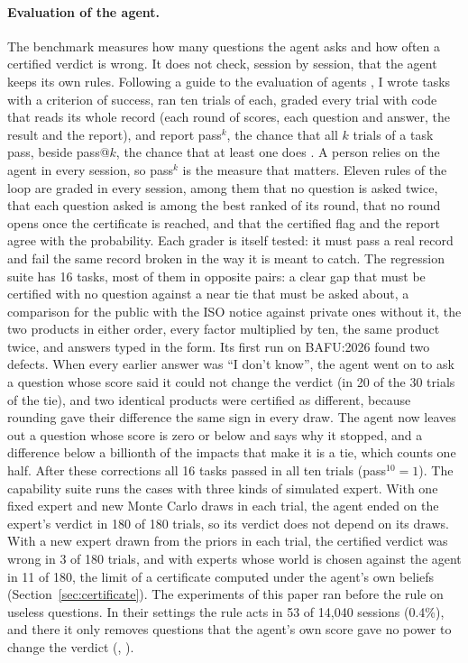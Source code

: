 \documentclass{article}
\begin{document}
\paragraph{Evaluation of the agent.}
The benchmark measures how many questions the agent asks and how often a certified verdict is wrong. It does
not check, session by session, that the agent keeps its own rules. Following a guide to the evaluation of
agents \citep{anthropicEvals}, I wrote tasks with a criterion of success, ran ten trials of each, graded every
trial with code that reads its whole record (each round of scores, each question and answer, the result and
the report), and report pass$^k$, the chance that all $k$ trials of a task pass, beside pass@$k$, the chance
that at least one does \citep{chen2021}. A person relies on the agent in every session, so pass$^k$ is the
measure that matters. Eleven rules of the loop are graded in every session, among them that no question is
asked twice, that each question asked is among the best ranked of its round, that no round opens once the
certificate is reached, and that the certified flag and the report agree with the probability. Each grader is
itself tested: it must pass a real record and fail the same record broken in the way it is meant to catch.
The regression suite has 16 tasks, most of them in opposite pairs: a clear gap that must be certified with no
question against a near tie that must be asked about, a comparison for the public with the ISO notice against
private ones without it, the two products in either order, every factor multiplied by ten, the same product
twice, and answers typed in the form. Its first run on BAFU:2026 found two defects. When every earlier answer
was ``I don't know'', the agent went on to ask a question whose score said it could not change the verdict
(in 20 of the 30 trials of the tie), and two identical products were certified as different, because rounding
gave their difference the same sign in every draw. The agent now leaves out a question whose score is zero or
below and says why it stopped, and a difference below a billionth of the impacts that make it is a tie, which
counts one half. After these corrections all 16 tasks passed in all ten trials (pass$^{10}=1$). The capability
suite runs the \nCases{} cases with three kinds of simulated expert. With one fixed expert and new Monte Carlo
draws in each trial, the agent ended on the expert's verdict in 180 of 180 trials, so its verdict does not
depend on its draws. With a new expert drawn from the priors in each trial, the certified verdict was wrong in
3 of 180 trials, and with experts whose world is chosen against the agent in 11 of 180, the limit of a
certificate computed under the agent's own beliefs (Section~\ref{sec:certificate}). The experiments of this
paper ran before the rule on useless questions. In their settings the rule acts in 53 of 14,040 sessions
(0.4\%), and there it only removes questions that the agent's own score gave no power to change the verdict
(, ).
\end{document}
